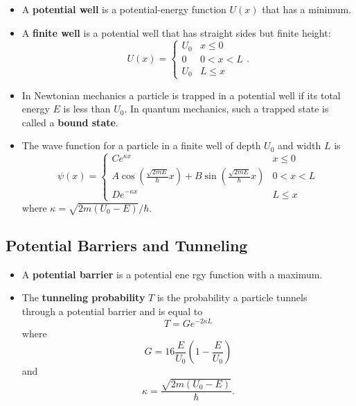 \documentclass{article}
\begin{document}
\begin{itemize}
  \item A \textbf{potential well} is a potential-energy function $U(x)$ that has a minimum.

  \item A \textbf{finite well} is a potential well that has straight sides but finite height: \[U(x) = \begin{cases}
            U_0 & x \le 0   \\
            0   & 0 < x < L \\
            U_0 & L \le x
          \end{cases}.\]

  \item In Newtonian mechanics a particle is trapped in a potential well if its total energy $E$ is less than $U_0$. In quantum mechanics, such a trapped state is called a \textbf{bound state}.

  \item The wave function for a particle in a finite well of depth $U_0$ and width $L$ is \[\psi(x) = \begin{cases}
            C e^{\kappa x}                                                                                          & x \le 0   \\
            A \cos \left( \frac{\sqrt{2 m E}}{\hbar} x \right) + B \sin \left( \frac{\sqrt{2 m E}}{\hbar} x \right) & 0 < x < L \\
            D e^{-\kappa x}                                                                                         & L \le x
          \end{cases}\] where $\kappa = \sqrt{2 m (U_0 - E)} / \hbar$.
\end{itemize}

\subsection{Potential Barriers and Tunneling}

\begin{itemize}
  \item A \textbf{potential barrier} is a potential ene rgy function with a maximum.

  \item The \textbf{tunneling probability} $T$ is the probability a particle tunnels\\through a potential barrier and is equal to \[T = G e^{-2 \kappa L}\] where \[G = 16 \frac{E}{U_0} \left( 1 - \frac{E}{U_0} \right)\] and \[\kappa = \frac{\sqrt{2 m (U_0 - E)}}{\hbar}.\]
\end{itemize}
\end{document}
